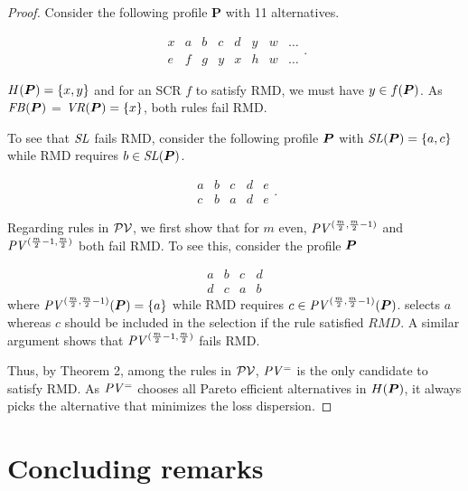 \documentclass[version=3.21, pagesize, twoside=off, bibliography=totoc, DIV=calc, fontsize=12pt, a4paper]{scrartcl}
\begin{document}
\begin{proof}
Consider the following profile $\mathbf{P}$ with 11 alternatives.

	\begin{equation}
		\begin{array}{llllllll}
			x&a&b&c&d&y&w&\ldots \\		e&f&g&y&x&h&w&\ldots
		\end{array}.
	\end{equation}


$H(\bm{P})=\{x, y\}$ and for an SCR $f$ to satisfy RMD, we must have $y\in   f(\bm{P})$. As $\mathit{FB}(\bm{P})$ = $\mathit{VR}(\bm{P})=\{x\}$, both rules fail RMD. 

To see that $\mathit{SL}$ fails RMD, consider the following profile $\bm{P}$ with $\mathit{SL}(\bm{P})=\{a, c\}$ while RMD requires $b \in \mathit{SL}(\bm{P})$. 


	\begin{equation}
		\begin{array}{lllll}
			a&b&c&d&e \\		c&b&a&d&e
		\end{array}.
	\end{equation}


Regarding rules in $\mathcal{PV}$, we first show that for $m$ even, $\PVv[(\frac{m}{2}, \frac{m}{2} - 1)]$ and $\PVv[(\frac{m}{2} - 1, \frac{m}{2})]$ both fail RMD. To see this, consider the profile $\bm{P}$

	\begin{equation}
		\begin{array}{llll}
			a&b&c&d \\		d&c&a&b
		\end{array}
	\end{equation}
where $\PVv[(\frac{m}{2}, \frac{m}{2} - 1)](\prof)=\{a\}$ while RMD requires $c \in \PVv[(\frac{m}{2}, \frac{m}{2} - 1)](\prof)$.  selects $a$ whereas $c$ should be included in the selection if the rule satisfied $RMD$. A similar argument shows that $\PVv[(\frac{m}{2} - 1, \frac{m}{2})]$ fails RMD.

Thus, by Theorem 2, among the rules in $\mathcal{PV}$, $\mathit{PV^=}$ is the only candidate to satisfy RMD. As $\mathit{PV^=}$ chooses all Pareto efficient alternatives in $H(\bm{P})$, it always picks the alternative that minimizes the loss dispersion.
\end{proof}

\section{Concluding remarks}
\end{document}
